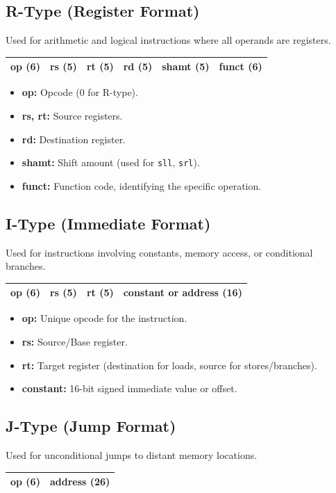 \subsection{R-Type (Register Format)}
Used for arithmetic and logical instructions where all operands are registers.
\begin{table}[h]
\centering
\begin{tabular}{|c|c|c|c|c|c|}
\hline
\textbf{op} (6) & \textbf{rs} (5) & \textbf{rt} (5) & \textbf{rd} (5) & \textbf{shamt} (5) & \textbf{funct} (6) \\
\hline
\end{tabular}
\end{table}
\begin{itemize}
    \item \textbf{op:} Opcode (0 for R-type).
    \item \textbf{rs, rt:} Source registers.
    \item \textbf{rd:} Destination register.
    \item \textbf{shamt:} Shift amount (used for \texttt{sll}, \texttt{srl}).
    \item \textbf{funct:} Function code, identifying the specific operation.
\end{itemize}

\subsection{I-Type (Immediate Format)}
Used for instructions involving constants, memory access, or conditional branches.
\begin{table}[h]
\centering
\begin{tabular}{|c|c|c|c|}
\hline
\textbf{op} (6) & \textbf{rs} (5) & \textbf{rt} (5) & \textbf{constant or address} (16) \\
\hline
\end{tabular}
\end{table}
\begin{itemize}
    \item \textbf{op:} Unique opcode for the instruction.
    \item \textbf{rs:} Source/Base register.
    \item \textbf{rt:} Target register (destination for loads, source for stores/branches).
    \item \textbf{constant:} 16-bit signed immediate value or offset.
\end{itemize}

\subsection{J-Type (Jump Format)}
Used for unconditional jumps to distant memory locations.
\begin{table}[h]
\centering
\begin{tabular}{|c|c|}
\hline
\textbf{op} (6) & \textbf{address} (26) \\
\hline
\end{tabular}
\end{table}

